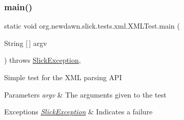 \subsubsection{\texorpdfstring{main()}{main()}}
{\footnotesize\ttfamily static void org.\+newdawn.\+slick.\+tests.\+xml.\+X\+M\+L\+Test.\+main (\begin{DoxyParamCaption}\item[{String \mbox{[}$\,$\mbox{]}}]{argv }\end{DoxyParamCaption}) throws \mbox{\hyperlink{classorg_1_1newdawn_1_1slick_1_1_slick_exception}{Slick\+Exception}}\hspace{0.3cm}{\ttfamily [inline]}, {\ttfamily [static]}}

Simple test for the X\+ML parsing A\+PI


\begin{DoxyParams}{Parameters}
{\em argv} & The arguments given to the test \\
\hline
\end{DoxyParams}

\begin{DoxyExceptions}{Exceptions}
{\em \mbox{\hyperlink{classorg_1_1newdawn_1_1slick_1_1_slick_exception}{Slick\+Exception}}} & Indicates a failure \\
\hline
\end{DoxyExceptions}


